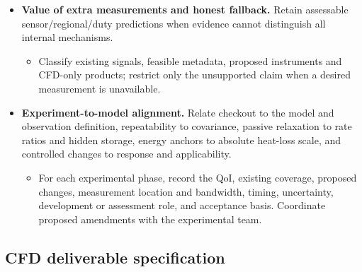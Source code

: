 \begin{itemize}[leftmargin=*]
\begin{itemize}
\item Compare actual feasible choices under nuisance/\allowbreak{}input uncertainty; report ranking sensitivity and computational cost rather than asserting a universal optimal experiment.
\end{itemize}
\item {}\textbf{Value of extra measurements and honest fallback.} Retain assessable sensor/\allowbreak{}regional/\allowbreak{}duty predictions when evidence cannot distinguish all internal mechanisms.
\begin{itemize}
\item Classify existing signals, feasible metadata, proposed instruments and CFD-only products; restrict only the unsupported claim when a desired measurement is unavailable.
\end{itemize}
\item {}\textbf{Experiment-to-model alignment.} Relate checkout to the model and observation definition, repeatability to covariance, passive relaxation to rate ratios and hidden storage, energy anchors to absolute heat-loss scale, and controlled changes to response and applicability.
\begin{itemize}
\item For each experimental phase, record the QoI, existing coverage, proposed changes, measurement location and bandwidth, timing, uncertainty, development or assessment role, and acceptance basis. Coordinate proposed amendments with the experimental team.
\end{itemize}
\end{itemize}

\subsection{CFD deliverable specification}\label{subsec:cfd-deliverable-specification}

